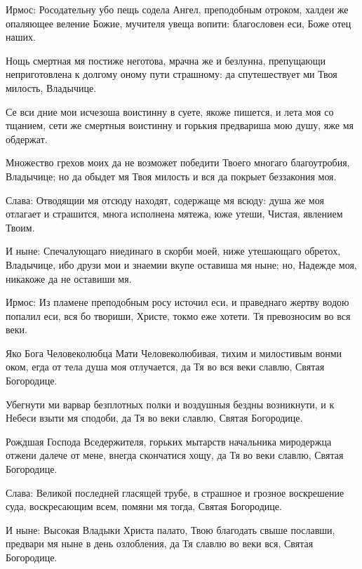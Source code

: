 \begin{mymulticols}


Ирмос: Росодательну убо пещь содела Ангел, преподобным отроком, халдеи же опаляющее веление Божие, мучителя увеща вопити: благословен еси, Боже отец наших.





Нощь смертная мя постиже неготова, мрачна же и безлунна, препущающи неприготовлена к долгому оному пути страшному: да спутешествует ми Твоя милость, Владычице.


Се вси дние мои исчезоша воистинну в суете, якоже пишется, и лета моя со тщанием, сети же смертныя воистинну и горькия предвариша мою душу, яже мя обдержат.


Множество грехов моих да не возможет победити Твоего многаго благоутробия, Владычице; но да обыдет мя Твоя милость и вся да покрыет беззакония моя.


Слава: Отводящии мя отсюду находят, содержаще мя всюду: душа же моя отлагает и страшится, многа исполнена мятежа, юже утеши, Чистая, явлением Твоим.


И ныне: Спечалующаго ниединаго в скорби моей, ниже утешающаго обретох, Владычице, ибо друзи мои и знаемии вкупе оставиша мя ныне; но, Надежде моя, никакоже да не оставиши мя.




Ирмос: Из пламене преподобным росу источил еси, и праведнаго жертву водою попалил еси, вся бо твориши, Христе, токмо еже хотети. Тя превозносим во вся веки.





Яко Бога Человеколюбца Мати Человеколюбивая, тихим и милостивым вонми оком, егда от тела душа моя отлучается, да Тя во вся веки славлю, Святая Богородице.


Убегнути ми варвар безплотных полки и воздушныя бездны возникнути, и к Небеси взыти мя сподоби, да Тя во веки славлю, Святая Богородице.


Рождшая Господа Вседержителя, горьких мытарств начальника миродержца отжени далече от мене, внегда скончатися хощу, да Тя во веки славлю, Святая Богородице.


Слава: Великой последней гласящей трубе, в страшное и грозное воскрешение суда, воскресающим всем, помяни мя тогда, Святая Богородице.


И ныне: Высокая Владыки Христа палато, Твою благодать свыше пославши, предвари мя ныне в день озлобления, да Тя славлю во веки вся, Святая Богородице.



\end{mymulticols}
